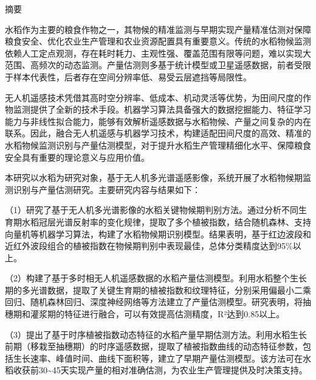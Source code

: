
\pagestyle{frontmatterstyle}

\begin{center}
  {\heiti 摘要}\\[6pt]
\end{center}

\normalsize

水稻作为主要的粮食作物之一，其物候的精准监测与早期实现产量精准估测对保障粮食安全、优化农业生产管理和农业资源配置具有重要意义。传统的水稻物候监测依赖人工定点观测，存在耗时耗力、主观性强、覆盖范围有限等问题，难以实现大范围、高频次的动态监测。产量估测则多基于统计模型或卫星遥感数据，前者受限于样本代表性，后者存在空间分辨率低、易受云层遮挡等局限性。

无人机遥感技术凭借其高时空分辨率、低成本、机动灵活等优势，为田间尺度的作物监测提供了全新的技术手段。机器学习算法具备强大的数据挖掘能力、特征学习能力与非线性拟合能力，能够有效解析遥感数据与水稻物候、产量之间复杂的内在联系。因此，融合无人机遥感与机器学习技术，构建适配田间尺度的高效、精准的水稻物候监测识别与产量估测模型，对于提升水稻生产管理精细化水平、保障粮食安全具有重要的理论意义与应用价值。

本研究以水稻为研究对象，基于无人机多光谱遥感影像，系统开展了水稻物候期监测识别与产量估测研究。主要研究内容与结果如下：

（1）研究了基于无人机多光谱影像的水稻关键物候期判别方法。通过分析不同生育期水稻冠层光谱反射率的变化规律，提取了多个植被指数，结合随机森林、支持向量机等机器学习算法，构建了水稻物候期识别模型。结果表明，基于红边波段和近红外波段组合的植被指数在物候期判别中表现最佳，总体分类精度达到95\%以上。

（2）构建了基于多时相无人机遥感数据的水稻产量估测模型。利用水稻整个生长期的多光谱数据，提取了关键生育期的植被指数和纹理特征，分别采用偏最小二乘回归、随机森林回归、深度神经网络等方法建立了产量估测模型。研究表明，将抽穗期和灌浆期的特征进行融合，可以有效提高估测精度，R²达到0.85以上。

（3）提出了基于时序植被指数动态特征的水稻产量早期估测方法。利用水稻生长前期（移栽至抽穗期）的时序遥感数据，提取了植被指数曲线的动态特征参数，包括生长速率、峰值时间、曲线下面积等，建立了早期产量估测模型。该方法可在水稻收获前30\~{}45天实现产量的相对准确估测，为农业生产管理提供及时决策支持。

